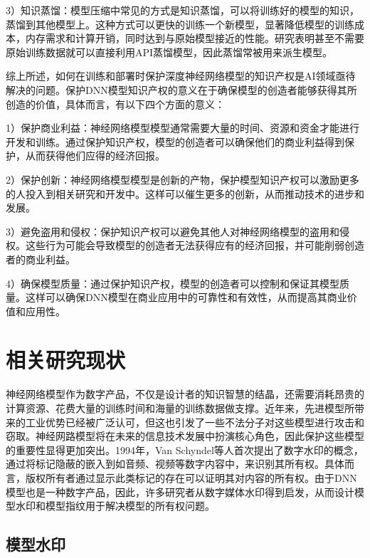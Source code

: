 3）知识蒸馏：模型压缩中常见的方式是知识蒸馏\cite{gou2021knowledge}，可以将训练好的模型的知识，蒸馏到其他模型上。这种方式可以更快的训练一个新模型，显著降低模型的训练成本，内存需求和计算开销，同时达到与原始模型接近的性能。研究\cite{hinton2015distilling}表明甚至不需要原始训练数据就可以直接利用API蒸馏模型，因此蒸馏常被用来派生模型。
	
综上所述，如何在训练和部署时保护深度神经网络模型的知识产权是AI领域亟待解决的问题。保护DNN模型知识产权的意义在于确保模型的创造者能够获得其所创造的价值，具体而言，有以下四个方面的意义：

1）保护商业利益：神经网络模型模型通常需要大量的时间、资源和资金才能进行开发和训练。通过保护知识产权，模型的创造者可以确保他们的商业利益得到保护，从而获得他们应得的经济回报。

2）保护创新：神经网络模型模型是创新的产物，保护模型知识产权可以激励更多的人投入到相关研究和开发中。这样可以催生更多的创新，从而推动技术的进步和发展。

3）避免盗用和侵权：保护知识产权可以避免其他人对神经网络模型的盗用和侵权。这些行为可能会导致模型的创造者无法获得应有的经济回报，并可能削弱创造者的商业利益。

4）确保模型质量：通过保护知识产权，模型的创造者可以控制和保证其模型质量。这样可以确保DNN模型在商业应用中的可靠性和有效性，从而提高其商业价值和应用性。


\section{相关研究现状}

神经网络模型作为数字产品，不仅是设计者的知识智慧的结晶，还需要消耗昂贵的计算资源、花费大量的训练时间和海量的训练数据做支撑。近年来，先进模型所带来的工业优势已经被广泛认可，但这也引发了一些不法分子对这些模型进行攻击和窃取。神经网路模型将在未来的信息技术发展中扮演核心角色，因此保护这些模型的重要性显得更加突出。1994年，Van Schyndel等人\cite{van1994digital}首次提出了数字水印的概念，通过将标记隐蔽的嵌入到如音频、视频等数字内容中，来识别其所有权。具体而言，版权所有者通过显示此类标记的存在可以证明其对内容的所有权。由于DNN模型也是一种数字产品，因此，许多研究者从数字媒体水印得到启发，从而设计模型水印和模型指纹用于解决模型的所有权问题。

\subsection{模型水印}

